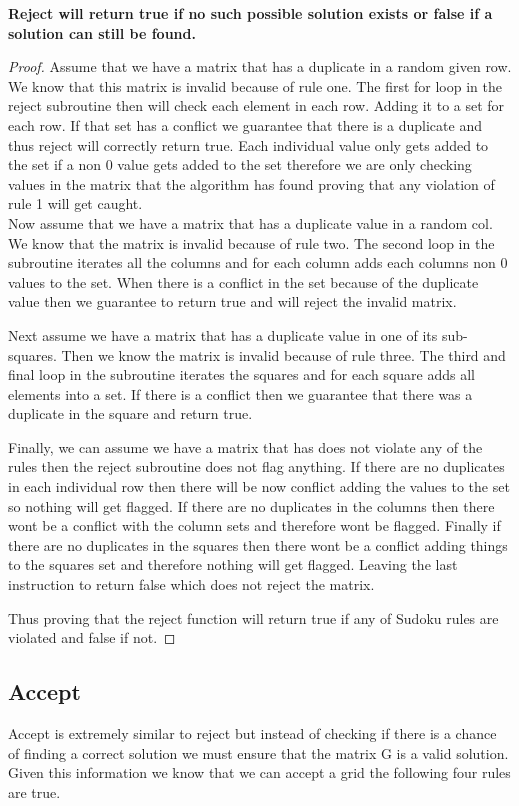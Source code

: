 \documentclass{sig-alternate}
\begin{document}
\textbf{Reject will return true if no such possible solution exists or false if a solution can still be found. }
\begin{proof}

Assume that we have a matrix that has a duplicate in a random given row. We know that this matrix is invalid because of rule one. The first for loop in the reject subroutine then will check each element in each row. Adding it to a set for each row. If that set has a conflict we guarantee that there is a duplicate and thus reject will correctly return true. Each individual value only gets added to the set if a non 0 value gets added to the set therefore we are only checking values in the matrix that the algorithm has found proving that any violation of rule 1 will get caught. \\

Now assume that we have a matrix that has a duplicate value in a random col.
We know that the matrix is invalid because of rule two. The second loop in the subroutine iterates all the columns and for each column adds each columns non 0 values to the set. When there is a conflict in the set because of the duplicate value then we guarantee to return true and will reject the invalid matrix. 

Next assume we have a matrix that has a duplicate value in one of its sub-squares. Then we know the matrix is invalid because of rule three. The third and final loop in the subroutine iterates the squares and for each square adds all elements into a set. If there is a conflict then we guarantee that there was a duplicate in the square and return true. 

Finally, we can assume we have a matrix that has does not violate any of the rules then the reject subroutine does not flag anything. If there are no duplicates in each individual row then there will be now conflict adding the values to the set so nothing will get flagged. If there are no duplicates in the columns then there wont be a conflict with the column sets and therefore wont be flagged. Finally if there are no duplicates in the squares then there wont be a conflict adding things to the squares set and therefore nothing will get flagged. Leaving the last instruction to return false which does not reject the matrix. 

Thus proving that the reject function will return true if any of Sudoku rules are violated and false if not. 
\end{proof}

\subsection{Accept}
Accept is extremely similar to reject but instead of checking if there is a chance of finding a correct solution we must ensure that the matrix G is a valid solution. Given this information we know that we can accept a grid the following four rules are true. 
\end{document}
